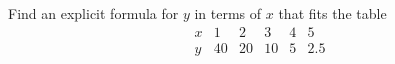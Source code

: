 Find an explicit formula for $y$ in terms of $x$ that fits the table
\[
\begin{array}{c|ccccc}
x&1&2&3&4&5\\\hline
y&40&20&10&5&2.5
\end{array}
\]
